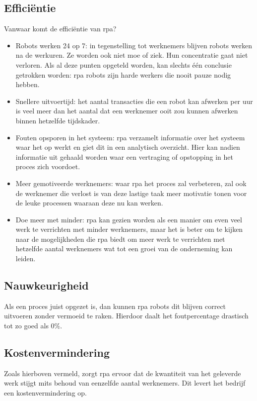 \subsection{Efficiëntie}
Vanwaar komt de efficiëntie van \acrshort{rpa}?
\begin{itemize}
	\item Robots werken 24 op 7: in tegenstelling tot werknemers blijven robots werken na de werkuren. Ze worden ook niet moe of ziek. Hun concentratie gaat niet verloren. Als al deze punten opgeteld worden, kan slechts één conclusie getrokken worden: \acrshort{rpa} robots zijn harde werkers die nooit pauze nodig hebben.
	\item Snellere uitvoertijd: het aantal transacties die een robot kan afwerken per uur is veel meer dan het aantal dat een werknemer ooit zou kunnen afwerken binnen hetzelfde tijdskader.
	\item Fouten opsporen in het systeem: \acrshort{rpa} verzamelt informatie over het systeem waar het op werkt en giet dit in een analytisch overzicht. Hier kan nadien informatie uit gehaald worden waar een vertraging of opstopping in het proces zich voordoet.
	\item Meer gemotiveerde werknemers: waar \acrshort{rpa} het proces zal verbeteren, zal ook de werknemer die verlost is van deze lastige taak meer motivatie tonen voor de leuke processen waaraan deze nu kan werken.
	\item Doe meer met minder: \acrshort{rpa} kan gezien worden als een manier om even veel werk te verrichten met minder werknemers, maar het is beter om te kijken naar de mogelijkheden die \acrshort{rpa} biedt om meer werk te verrichten met hetzelfde aantal werknemers wat tot een groei van de onderneming kan leiden.
\end{itemize}

\autocite{efficiencyRPA}
\subsection{Nauwkeurigheid}
Als een proces juist opgezet is, dan kunnen \acrshort{rpa} robots dit blijven correct uitvoeren zonder vermoeid te raken. Hierdoor daalt het foutpercentage drastisch tot zo goed als 0\%. \autocite{efficiencyRPA}

\subsection{Kostenvermindering}
Zoals hierboven vermeld, zorgt \acrshort{rpa} ervoor dat de kwantiteit van het geleverde werk stijgt mits behoud van eenzelfde aantal werknemers. Dit levert het bedrijf een kostenvermindering op. \autocite{efficiencyRPA}

